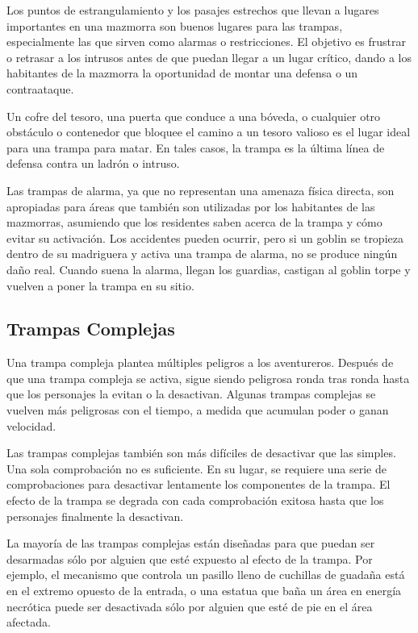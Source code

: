 \documentclass[a4paper,twocolumn,openany,10pt]{dndbook}
\begin{document}
Los puntos de estrangulamiento y los pasajes estrechos que llevan a lugares importantes en una mazmorra son buenos lugares para
las trampas, especialmente las que sirven como alarmas o restricciones. El objetivo es frustrar o retrasar a los intrusos antes
de que puedan llegar a un lugar crítico, dando a los habitantes de la mazmorra la oportunidad de montar una defensa o un
contraataque.

Un cofre del tesoro, una puerta que conduce a una bóveda, o cualquier otro obstáculo o contenedor que bloquee el camino a un
tesoro valioso es el lugar ideal para una trampa para matar. En tales casos, la trampa es la última línea de defensa contra un
ladrón o intruso.

Las trampas de alarma, ya que no representan una amenaza física directa, son apropiadas para áreas que también son utilizadas
por los habitantes de las mazmorras, asumiendo que los residentes saben acerca de la trampa y cómo evitar su activación. Los
accidentes pueden ocurrir, pero si un goblin se tropieza dentro de su madriguera y activa una trampa de alarma, no se produce
ningún daño real. Cuando suena la alarma, llegan los guardias, castigan al goblin torpe y vuelven a poner la trampa en su sitio. 

\subsection{Trampas Complejas}
Una trampa compleja plantea múltiples peligros a los aventureros. Después de que una trampa compleja se activa, sigue siendo
peligrosa ronda tras ronda hasta que los personajes la evitan o la desactivan. Algunas trampas complejas se vuelven más
peligrosas con el tiempo, a medida que acumulan poder o ganan velocidad.

Las trampas complejas también son más difíciles de desactivar que las simples. Una sola comprobación no es suficiente. En su
lugar, se requiere una serie de comprobaciones para desactivar lentamente los componentes de la trampa. El efecto de la trampa se
degrada con cada comprobación exitosa hasta que los personajes finalmente la desactivan.

La mayoría de las trampas complejas están diseñadas para que puedan ser desarmadas sólo por alguien que esté expuesto al efecto
de la trampa. Por ejemplo, el mecanismo que controla un pasillo lleno de cuchillas de guadaña está en el extremo opuesto de la
entrada, o una estatua que baña un área en energía necrótica puede ser desactivada sólo por alguien que esté de pie en el área
afectada. 
\end{document}
